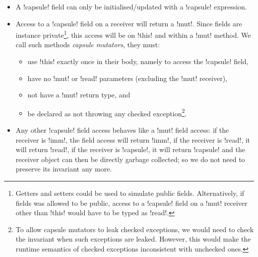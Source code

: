 \SSI\begin{itemize}
	\item A \Q!capsule! field can only be initialised/updated with a \Q!capsule! expression.
	\item Access to a \Q!capsule! field on a \Q@mut@ receiver will return a \Q!mut!. Since fields are instance private\footnote{Getters and setters could be used to simulate public fields. Alternatively, if fields was allowed to be public, access to a \Q!capsule! field on a \Q!mut! receiver other than \Q!this! would have to be typed as \Q!read!.}, this access will be on \Q!this! and within a \Q!mut! method. We call such methods \emph{capsule mutators}, they must:
\begin{itemize}
		\item use \Q!this! exactly once in their body, namely to access the \Q!capsule! field,
		\item have no \Q!mut! or \Q!read! parameters (excluding the \Q!mut! receiver),
		\item not have a \Q!mut! return type, and
		\item be declared as not throwing any checked exception\footnote{To allow capsule mutators to leak checked exceptions, we would need to check the invariant when such exceptions are leaked. However, this would make the runtime semantics of checked exceptions inconsistent with unchecked ones.}.
	\end{itemize}	
	\item Any other \Q!capsule! field access behaves like a \Q!mut! field access: if the receiver is \Q!imm!, the field access will return \Q!imm!, if the receiver is \Q!read!, it will return \Q!read!, if the receiver is \Q!capsule!, it will return \Q!capsule! and
the \Q@capsule@ receiver object can then be directly garbage collected; so we do not need to preserve its invariant any more. %
	
\end{itemize}

